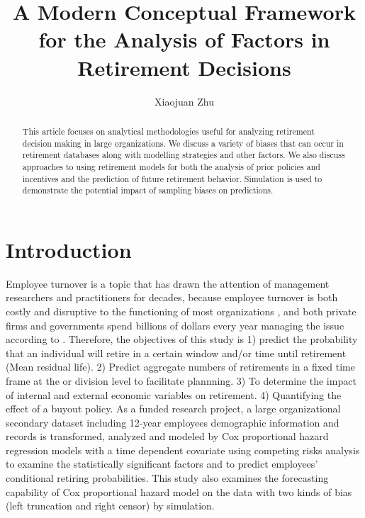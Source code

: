 \documentclass[12pt,letterpaper]{article}
\title{A Modern Conceptual Framework for the Analysis of Factors in Retirement Decisions}
\author{Xiaojuan Zhu}
\begin{document}
\maketitle

\begin{abstract}
This article focuses on analytical methodologies useful for analyzing retirement decision making in large organizations.  We discuss a variety of biases that can occur in retirement databases along with modelling strategies and other factors.  We also discuss approaches to using retirement models for both the analysis of prior policies and incentives and the prediction of future retirement behavior.  Simulation is used to demonstrate the potential impact of sampling biases on predictions.
\end{abstract}



\section{Introduction}
Employee turnover is a topic that has drawn the attention of management researchers and practitioners for decades, because  employee turnover is both costly and disruptive to the functioning of most organizations \citep{staw1980, mueller1989,kacmar2006}, and both private firms and governments spend billions of dollars every year managing the issue according to \citet{leonard2001}. Therefore, the objectives of this study is
1) predict the probability that an individual will retire in a certain window and/or time until retirement (Mean residual life).
2) Predict aggregate numbers of retirements in a fixed time frame at the or division level to facilitate plannning.
3) To determine the impact of internal and external economic variables on retirement.
4) Quantifying the effect of a buyout policy.
As a funded research project, a large organizational secondary dataset including 12-year employees demographic information and records is transformed, analyzed and modeled by Cox proportional hazard regression models with a time dependent covariate using competing risks analysis to examine the statistically significant factors and to predict employees' conditional retiring probabilities. This study also examines the forecasting capability of Cox proportional hazard model on the data with two kinds of bias (left truncation and right censor) by simulation.
\end{document}
